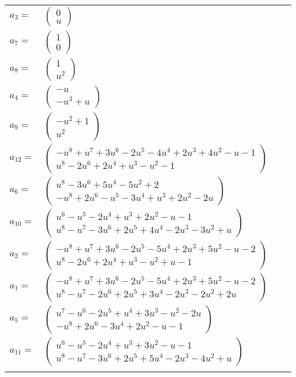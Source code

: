 \documentclass[1p]{elsarticle_modified}
\theoremstyle{definition}
\begin{document}
\begin{tabular}{m{7pt} m{180pt} m{7pt} m{180pt} }
\flushright $a_{3}=$&$\begin{pmatrix}0\\u\end{pmatrix}$ \\
\flushright $a_{7}=$&$\begin{pmatrix}1\\0\end{pmatrix}$ \\
\flushright $a_{8}=$&$\begin{pmatrix}1\\u^2\end{pmatrix}$ \\
\flushright $a_{4}=$&$\begin{pmatrix}- u\\- u^3+u\end{pmatrix}$ \\
\flushright $a_{9}=$&$\begin{pmatrix}- u^2+1\\u^2\end{pmatrix}$ \\
\flushright $a_{12}=$&$\begin{pmatrix}- u^8+u^7+3 u^6-2 u^5-4 u^4+2 u^3+4 u^2- u-1\\u^8-2 u^6+2 u^4+u^3- u^2-1\end{pmatrix}$ \\
\flushright $a_{6}=$&$\begin{pmatrix}u^8-3 u^6+5 u^4-5 u^2+2\\- u^8+2 u^6- u^5-3 u^4+u^3+2 u^2-2 u\end{pmatrix}$ \\
\flushright $a_{10}=$&$\begin{pmatrix}u^6- u^5-2 u^4+u^3+2 u^2- u-1\\u^8- u^7-3 u^6+2 u^5+4 u^4-2 u^3-3 u^2+u\end{pmatrix}$ \\
\flushright $a_{2}=$&$\begin{pmatrix}- u^8+u^7+3 u^6-2 u^5-5 u^4+2 u^3+5 u^2- u-2\\u^8-2 u^6+2 u^4+u^3- u^2+u-1\end{pmatrix}$ \\
\flushright $a_{1}=$&$\begin{pmatrix}- u^8+u^7+3 u^6-2 u^5-5 u^4+2 u^3+5 u^2- u-2\\u^8- u^7-2 u^6+2 u^5+3 u^4-2 u^3-2 u^2+2 u\end{pmatrix}$ \\
\flushright $a_{5}=$&$\begin{pmatrix}u^7- u^6-2 u^5+u^4+3 u^3- u^2-2 u\\- u^8+2 u^6-3 u^4+2 u^2- u-1\end{pmatrix}$ \\
\flushright $a_{11}=$&$\begin{pmatrix}u^6- u^5-2 u^4+u^3+3 u^2- u-1\\u^8- u^7-3 u^6+2 u^5+5 u^4-2 u^3-4 u^2+u\end{pmatrix}$\\&\end{tabular}
\end{document}
